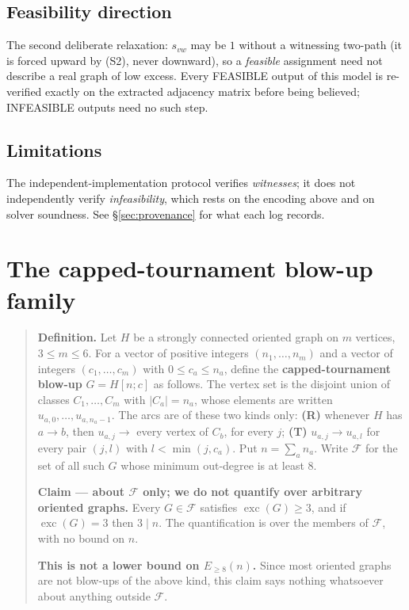 \documentclass[11pt]{amsart}
\theoremstyle{remark}
\newcommand{\exc}{\operatorname{exc}}
\begin{document}
\subsection*{Feasibility direction}
The second deliberate relaxation: $s_{vw}$ may be $1$ without a witnessing
two-path (it is forced upward by (S2), never downward), so a \emph{feasible}
assignment need not describe a real graph of low excess. Every FEASIBLE output
of this model is re-verified exactly on the extracted adjacency matrix before
being believed; INFEASIBLE outputs need no such step.

\subsection*{Limitations}
The independent-implementation protocol verifies \emph{witnesses}; it does not
independently verify \emph{infeasibility}, which rests on the encoding above
and on solver soundness. See \S\ref{sec:provenance} for what each log records.

\section{The capped-tournament blow-up family}\label{app:class}

\begin{quote}
\textbf{Definition.} Let $H$ be a strongly connected oriented graph on $m$
vertices, $3 \le m \le 6$. For a vector of positive integers
$(n_1, \dots, n_m)$ and a vector of integers $(c_1, \dots, c_m)$ with
$0 \le c_a \le n_a$, define the \textbf{capped-tournament blow-up}
$G = H[n; c]$ as follows. The vertex set is the disjoint union of classes
$C_1, \dots, C_m$ with $|C_a| = n_a$, whose elements are written
$u_{a,0}, \dots, u_{a,n_a - 1}$. The arcs are of these two kinds only:
\textbf{(R)} whenever $H$ has $a \to b$, then $u_{a,j} \to$ every vertex of
$C_b$, for every $j$; \textbf{(T)} $u_{a,j} \to u_{a,l}$ for every pair
$(j,l)$ with $l < \min(j, c_a)$. Put $n = \sum_a n_a$. Write $\mathcal{F}$ for
the set of all such $G$ whose minimum out-degree is at least $8$.

\medskip
\textbf{Claim --- about $\mathcal{F}$ only; we do not quantify over arbitrary
oriented graphs.} Every $G \in \mathcal{F}$ satisfies $\exc(G) \ge 3$, and if
$\exc(G) = 3$ then $3 \mid n$. The quantification is over the members of
$\mathcal{F}$, with no bound on $n$.

\medskip
\textbf{This is not a lower bound on $E_{\ge 8}(n)$.} Since most oriented
graphs are not blow-ups of the above kind, this claim says nothing whatsoever
about anything outside $\mathcal{F}$.
\end{quote}
\end{document}
